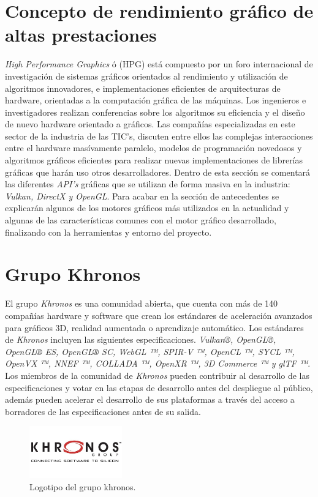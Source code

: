 \documentclass[a4paper]{book}
\begin{document}
\section{Concepto de rendimiento gráfico de altas prestaciones}
\label{sec:HPG}

\textit{High Performance Graphics} ó (HPG) \cite{HPG:assoc} está compuesto por un foro internacional de investigación de sistemas gráficos
orientados al rendimiento y utilización de algoritmos innovadores, e implementaciones eficientes de arquitecturas
de hardware, orientadas a la computación gráfica de las máquinas. Los ingenieros e investigadores realizan conferencias
sobre los algoritmos su eficiencia y el diseño de nuevo hardware orientado a gráficos. Las compañías especializadas
en este sector de la industria de las TIC’s, discuten entre ellos las complejas interacciones entre el hardware masívamente
paralelo, modelos de programación novedosos y algoritmos gráficos eficientes para realizar nuevas implementaciones de
librerías gráficas que harán uso otros desarrolladores. Dentro de esta sección se comentará las diferentes \textit{API’s}
gráficas que se utilizan de forma masiva en la industria: \textit{Vulkan, DirectX y OpenGL}. Para acabar en la sección de
antecedentes se explicarán algunos de los motores gráficos más utilizados en la actualidad y algunas de las características
comunes con el motor gráfico desarrollado, finalizando con la herramientas y entorno del proyecto.

\section{Grupo Khronos}
\label{sec:Grupo Khronos}

El grupo \textit{Khronos} es una comunidad abierta, que cuenta con más de 140 compañías hardware y software que crean los estándares de
aceleración avanzados para gráficos 3D, realidad aumentada o aprendizaje automático. Los estándares de \textit{Khronos} incluyen las
siguientes especificaciones.  \textit{Vulkan®, OpenGL®, OpenGL® ES, OpenGL® SC, WebGL ™, \textit{SPIR-V} ™, OpenCL ™, SYCL ™, OpenVX ™,
NNEF ™, COLLADA ™, OpenXR ™, 3D Commerce ™ y glTF ™}. Los miembros de la comunidad de \textit{Khronos} pueden contribuir al desarrollo
de las especificaciones y votar en las etapas de desarrollo antes del despliegue al público, además pueden acelerar el desarrollo
de sus plataformas a través del acceso a borradores de las especificaciones antes de su salida.

\begin{figure}[H]
    \centering
    \includegraphics[width=4cm, keepaspectratio]{img/khronos.jpg}
    \caption{Logotipo del grupo khronos.}
    \label{khronos}
\end{figure}
\end{document}
